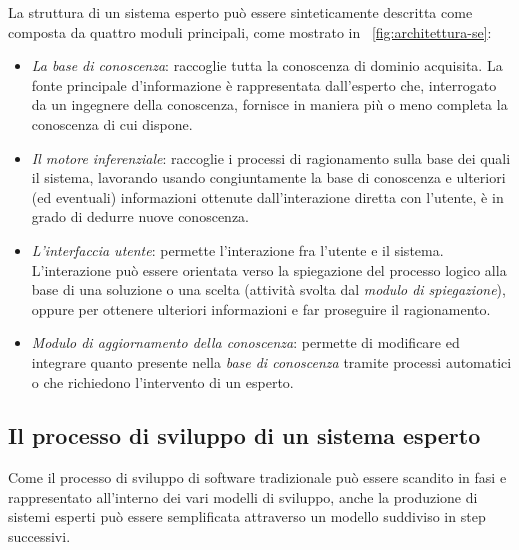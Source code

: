 La struttura di un sistema esperto può essere sinteticamente descritta come composta da quattro moduli principali, come mostrato in \figurename~\ref{fig:architettura-se}:
\begin{itemize}
	\item \emph{La base di conoscenza}: raccoglie tutta la conoscenza di dominio acquisita. La fonte principale d'informazione è rappresentata dall'esperto che, interrogato da un ingegnere della conoscenza, fornisce in maniera più o meno completa la conoscenza di cui dispone.
	\item \emph{Il motore inferenziale}: raccoglie i processi di ragionamento sulla base dei quali il sistema, lavorando usando congiuntamente la base di conoscenza e ulteriori (ed eventuali) informazioni ottenute dall'interazione diretta con l'utente, è in grado di dedurre nuove conoscenza.
	\item \emph{L'interfaccia utente}: permette l'interazione fra l'utente e il sistema. L'interazione può essere orientata verso la spiegazione del processo logico alla base di una soluzione o una scelta (attività svolta dal \emph{modulo di spiegazione}), oppure per ottenere ulteriori informazioni e far proseguire il ragionamento.
	\item \emph{Modulo di aggiornamento della conoscenza}: permette di modificare ed integrare quanto presente nella \emph{base di conoscenza} tramite processi automatici o che richiedono l'intervento di un esperto.
\end{itemize}

\subsection{Il processo di sviluppo di un sistema esperto}
Come il processo di sviluppo di software tradizionale può essere scandito in fasi e rappresentato all'interno dei vari modelli di sviluppo, anche la produzione di sistemi esperti può essere semplificata attraverso un modello suddiviso in step successivi. 

